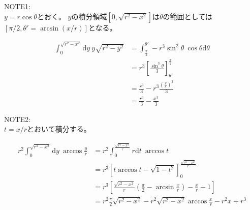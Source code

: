 NOTE1:\\
$y=r\cos \theta$とおく。
$y$の積分領域$[0, \sqrt{r^{2}-x^{2}}]$は$\theta$の範囲としては$[\pi/2, \theta' = \arcsin(x/r)]$となる。


\begin{align}
\int^{\sqrt{r^{2}-x^{2}}}_{0}\mathrm{d}y\ y\sqrt{r^{2}-y^{2}} &= \int^{\theta'}_{\frac{\pi}{2}}-r^{3}\sin^{2}\theta\ \cos\theta \mathrm{d}\theta\nonumber \\
&= r^{3}\left[ \frac{\sin^{3}\theta}{3} \right]^{\frac{\pi}{2}}_{\theta'}\nonumber \\
&= \frac{r^{3}}{3} - r^{3}\frac{\left( \frac{x}{r} \right)^{3}}{3}\nonumber \\
&= \frac{r^{3}}{3} - \frac{x^{3}}{3}
\end{align}

NOTE2:\\
$t = x/r$とおいて積分する。

\begin{align}
r^{2}\int^{\sqrt{r^{2}-x^{2}}}_{0}\mathrm{d}y\ \arccos \frac{y}{r} &= r^{2}\int^{\frac{\sqrt{r^{2}-x^{2}}}{r}}_{0}r\mathrm{d}t\ \arccos t\nonumber \\
&= r^{3}\left[ t\arccos t - \sqrt{1-t^{2}} \right]^{\frac{\sqrt{r^{2}-x^{2}}}{r}}_{0}\nonumber \\
&= r^{3}\left[ \frac{\sqrt{r^{2}-x^{2}}}{r}\left( \frac{\pi}{2} - \arcsin \frac{x}{r} \right) - \frac{x}{r} + 1 \right]\nonumber \\
&= r^{2}\frac{\pi}{2}\sqrt{r^{2}-x^{2}} - r^{2}\sqrt{r^{2}-x^{2}}\arccos\frac{x}{r} - r^{2}x + r^{3}
\end{align}

